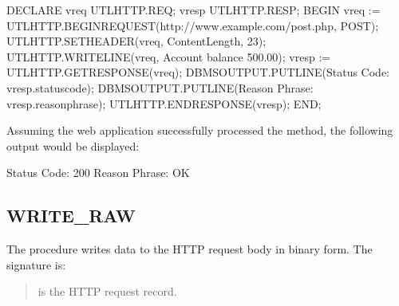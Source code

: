\documentclass[letterpaper,10pt,english,openany,oneside]{sphinxmanual}
\begin{document}
%
\begin{sphinxVerbatim}[commandchars=\\\{\}]
DECLARE
    v\PYGZus{}req           UTL\PYGZus{}HTTP.REQ;
    v\PYGZus{}resp          UTL\PYGZus{}HTTP.RESP;
BEGIN
    v\PYGZus{}req := UTL\PYGZus{}HTTP.BEGIN\PYGZus{}REQUEST(\PYGZsq{}http://www.example.com/post.php\PYGZsq{},
       \PYGZsq{}POST\PYGZsq{});
    UTL\PYGZus{}HTTP.SET\PYGZus{}HEADER(v\PYGZus{}req, \PYGZsq{}Content\PYGZhy{}Length\PYGZsq{}, \PYGZsq{}23\PYGZsq{});
    UTL\PYGZus{}HTTP.WRITE\PYGZus{}LINE(v\PYGZus{}req, \PYGZsq{}Account balance \PYGZdl{}500.00\PYGZsq{});
    v\PYGZus{}resp := UTL\PYGZus{}HTTP.GET\PYGZus{}RESPONSE(v\PYGZus{}req);
    DBMS\PYGZus{}OUTPUT.PUT\PYGZus{}LINE(\PYGZsq{}Status Code: \PYGZsq{} \textbar{}\textbar{} v\PYGZus{}resp.status\PYGZus{}code);
    DBMS\PYGZus{}OUTPUT.PUT\PYGZus{}LINE(\PYGZsq{}Reason Phrase: \PYGZsq{} \textbar{}\textbar{} v\PYGZus{}resp.reason\PYGZus{}phrase);
    UTL\PYGZus{}HTTP.END\PYGZus{}RESPONSE(v\PYGZus{}resp);
END;
\end{sphinxVerbatim}

Assuming the web application successfully processed the  method, the following output would be displayed:

%
\begin{sphinxVerbatim}[commandchars=\\\{\}]
Status Code: 200
Reason Phrase: OK
\end{sphinxVerbatim}

\newpage


\subsection{WRITE\_RAW}
\label{\detokenize{utl_http:write-raw}}
The  procedure writes data to the HTTP request body in binary
form. The signature is:
\begin{quote}

\end{quote}


\begin{quote}

 is the HTTP request record.
\end{quote}
\end{document}

